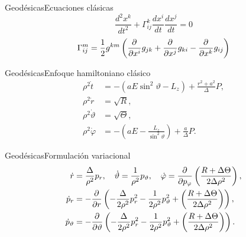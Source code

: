 
\begin{frame}{Geodésicas}{Ecuaciones clásicas}
	{\Huge
	\[
		\frac{d^2x^k}{dt^2} + \Gamma^k_{ij} \frac{d x^i}{dt} \frac{d x^j}{dt} = 0
	\]}
	\vfill
	\[
		\Gamma^m_{ij} = \frac{1}{2} g^{km} \left( \frac{\partial^{} }{\partial x^i} g_{jk} + \frac{\partial^{} }{\partial x^j} g_{ki} - \frac{\partial^{} }{\partial x^k}g_{ij} \right)	
	\]
\end{frame}

\begin{frame}{Geodésicas}{Enfoque hamiltoniano clásico}
	\large
	\begin{align*}
		\rho^2 \dot{t} &=-( aE\sin^2\vartheta - L_z) + \frac{r^2+a^2}{\Delta}P, \\
		\rho^2 \dot{r} &= \sqrt{R}, \\
		\rho^2 \dot{\vartheta} &= \sqrt{\Theta}, \\
		\rho^2 \dot{\varphi} &=-( aE - \frac{L_z}{\sin^2\vartheta}) + \frac{a}{\Delta}P.
	\end{align*}
\end{frame}

\begin{frame}{Geodésicas}{Formulación variacional}
	\large
	\begin{align*}
		\dot{r} &= \frac{\Delta}{\rho^2} p_r, \quad \dot{\vartheta} = \frac{1}{\rho^2}p_\vartheta, \quad
		\dot{\varphi} = \frac{\partial^{} }{\partial p_\varphi}\left( \frac{R + \Delta\Theta}{2\Delta\rho^2} \right), \\
		\dot{p}_r &= - \frac{\partial^{} }{\partial r} \left( - \frac{\Delta}{2\rho^2}p_r^2 - \frac{1}{2\rho^2}p_\vartheta^2 + \left( \frac{R + \Delta\Theta}{2\Delta\rho^2} \right) \right), \\
		\dot{p}_\vartheta &= - \frac{\partial^{} }{\partial \vartheta} \left( - \frac{\Delta}{2\rho^2}p_r^2 - \frac{1}{2\rho^2}p_\vartheta^2 + \left( \frac{R + \Delta\Theta}{2\Delta\rho^2} \right) \right).
	\end{align*}
	
\end{frame}
















